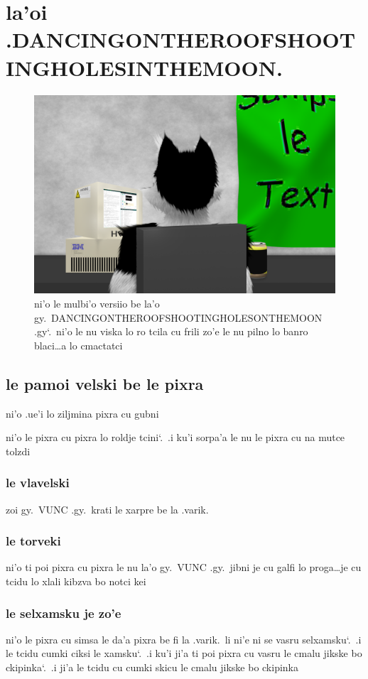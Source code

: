 \documentclass{report}
\newcommand\sds{\spacefactor\sfcode`.\ \space}
\begin{document}
\chapter{la'oi .DANCINGONTHEROOFSHOOTINGHOLESINTHEMOON.}
\begin{figure}[ht]
	\centering
	\includegraphics[width=\textwidth]{dancingontheroofshootingholesinthemoon/dancingontheroofshootingholesinthemoon.png}
	\caption[center]{ni'o le mulbi'o versiio be la'o gy.\ DANCINGONTHEROOFSHOOTINGHOLESONTHEMOON .gy\sds  ni'o le nu viska lo ro tcila cu frili zo'e le nu pilno lo banro blaci\ldots a lo cmactatci}
\end{figure}
\section{le pamoi velski be le pixra}
ni'o .ue'i lo ziljmina pixra cu gubni

ni'o le pixra cu pixra lo roldje tcini\sds  .i ku'i sorpa'a le nu le pixra cu na mutce tolzdi

\subsection{le vlavelski}
zoi gy.\ VUNC .gy.\ krati le xarpre be la .varik.
\subsection{le torveki}
ni'o ti poi pixra cu pixra le nu la'o gy.\ VUNC .gy.\ jibni je cu galfi lo proga\ldots je cu tcidu lo xlali kibzva bo notci kei

\subsection{le selxamsku je zo'e}
ni'o le pixra cu simsa le da'a pixra be fi la .varik.\ li ni'e ni se vasru selxamsku\sds  .i le tcidu cumki ciksi le xamsku\sds  .i ku'i ji'a ti poi pixra cu vasru le cmalu jikske bo ckipinka\sds  .i ji'a le tcidu cu cumki skicu le cmalu jikske bo ckipinka
\end{document}
